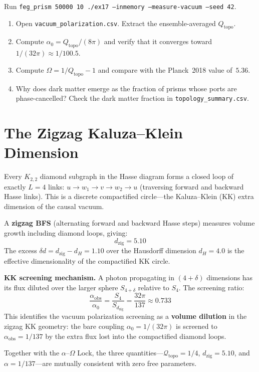 \documentclass[11pt, a4paper, openany]{book}
\begin{document}
\begin{simulation}
Run \texttt{feg\_prism 50000 10 ./ex17 --inmemory --measure-vacuum --seed 42}.
\begin{enumerate}
\item Open \texttt{vacuum\_polarization.csv}. Extract the ensemble-averaged $Q_{\mathrm{topo}}$.
\item Compute $\alpha_0 = Q_{\mathrm{topo}}/(8\pi)$ and verify that it converges toward $1/(32\pi) \approx 1/100.5$.
\item Compute $\Omega = 1/Q_{\mathrm{topo}} - 1$ and compare with the Planck~2018 value of~$5.36$.
\item Why does dark matter emerge as the fraction of prisms whose ports are phase-cancelled? Check the dark matter fraction in \texttt{topology\_summary.csv}.
\end{enumerate}
\end{simulation}


\section{The Zigzag Kaluza--Klein Dimension}\label{sec:zigzag-vol2}

Every $K_{2,2}$ diamond subgraph in the Hasse diagram forms a closed
loop of exactly $L = 4$ links:
$u \to w_1 \to v \to w_2 \to u$
(traversing forward and backward Hasse links).
This is a discrete compactified circle---the Kaluza--Klein (KK) extra
dimension of the causal vacuum.

A \textbf{zigzag BFS} (alternating forward and backward Hasse steps)
measures volume growth including diamond loops, giving:
\[
  d_{\mathrm{zig}} = 5.10
\]
The excess $\delta d = d_{\mathrm{zig}} - d_H = 1.10$ over the
Hausdorff dimension $d_H = 4.0$ is the effective dimensionality of the
compactified KK circle.

\textbf{KK screening mechanism.}
A photon propagating in $(4 + \delta)$ dimensions has its flux diluted
over the larger sphere $S_{4+\delta}$ relative to $S_4$.
The screening ratio:
\[
  \frac{\alpha_{\text{obs}}}{\alpha_0}
  = \frac{S_4}{S_{d_{\mathrm{zig}}}}
  = \frac{32\pi}{137}
  \approx 0.733
\]
This identifies the vacuum polarization screening as a \textbf{volume
dilution} in the zigzag KK geometry: the bare coupling
$\alpha_0 = 1/(32\pi)$ is screened to $\alpha_{\text{obs}} = 1/137$
by the extra flux lost into the compactified diamond loops.

Together with the $\alpha$--$\Omega$ Lock, the three
quantities---$\mathcal{Q}_{\mathrm{topo}} = 1/4$, $d_{\mathrm{zig}} = 5.10$, and
$\alpha = 1/137$---are mutually consistent with zero free parameters.
\end{document}
